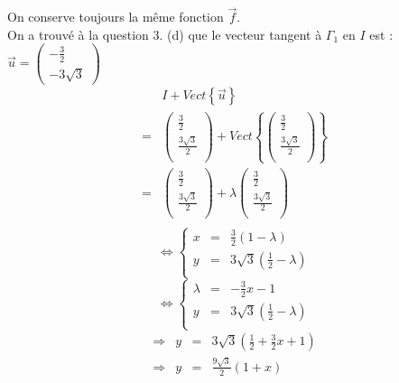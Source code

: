 On conserve toujours la même fonction $\overrightarrow{f}$.\\
On a trouvé à la question 3. (d) que le vecteur tangent à $\Gamma_1$ en $I$ est :
$ \overrightarrow{u} =
  \left(
  \begin{array}{c}
      -\frac{3}{2} \\ -3\sqrt{3}
    \end{array}
  \right)
$
\[
  \begin{array}{cl}
      & I + Vect\left\{\overrightarrow{u}\right\} \\
    = & \left(
    \begin{array}{c}
        \frac{3}{2}         \\
        \frac{3\sqrt{3}}{2} \\
      \end{array}\right)
    + Vect\left\{\left(
    \begin{array}{c}
        \frac{3}{2}         \\
        \frac{3\sqrt{3}}{2} \\
      \end{array}\right)
    \right\}                                      \\
    = & \left(
    \begin{array}{c}
        \frac{3}{2}         \\
        \frac{3\sqrt{3}}{2} \\
      \end{array}\right)
    + \lambda\left(
    \begin{array}{c}
        \frac{3}{2}         \\
        \frac{3\sqrt{3}}{2} \\
      \end{array}\right)              \\
  \end{array}
\]
\[
  \iff
  \left\{
  \begin{array}{rcl}
    x & = & \frac{3}{2}(1-\lambda)                    \\
    y & = & 3\sqrt{3}\left(\frac{1}{2}-\lambda\right) \\
  \end{array}
  \right.
\]
\[
  \iff
  \left\{
  \begin{array}{rcl}
    \lambda & = & -\frac{3}{2}x-1                           \\
    y       & = & 3\sqrt{3}\left(\frac{1}{2}-\lambda\right) \\
  \end{array}
  \right.
\]
\[
  \begin{array}{lrcl}
    \Rightarrow & y & = & 3\sqrt{3}\left(\frac{1}{2}+\frac{3}{2}x+1\right) \\
    \Rightarrow & y & = & \frac{9\sqrt{3}}{2}\left(1+x\right)              \\
  \end{array}
\]
